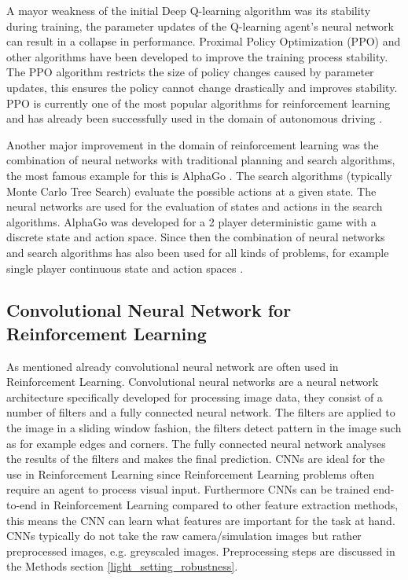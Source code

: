 A mayor weakness of the initial Deep Q-learning algorithm was its stability during training, the parameter updates of the Q-learning agent's neural network can result in a collapse in performance. Proximal Policy Optimization (PPO) and other algorithms have been developed to improve the training process stability. The PPO \autocite{ppo} algorithm restricts the size of policy changes caused by parameter updates, this ensures the policy cannot change drastically and improves stability. PPO is currently one of the most popular algorithms for reinforcement learning and has already been successfully used in the domain of autonomous driving \autocite{maximilian}.


Another major improvement in the domain of reinforcement learning was the combination of neural networks with traditional planning and search algorithms, the most famous example for this is AlphaGo \autocite{alphago}. The search algorithms (typically Monte Carlo Tree Search) evaluate the possible actions at a given state. The neural networks are used for the evaluation of states and actions in the search algorithms. AlphaGo was developed for a 2 player deterministic game with a discrete state and action space. Since then the combination of neural networks and search algorithms has also been used for all kinds of problems, for example single player continuous state and action spaces \autocite{alphagoimprovementmuzero}.


\subsection*{Convolutional Neural Network for Reinforcement Learning}

As mentioned already convolutional neural network are often used in Reinforcement Learning. Convolutional neural networks are a neural network architecture specifically developed for processing image data, they consist of a number of filters and a fully connected neural network. The filters are applied to the image in a sliding window fashion, the filters detect pattern in the image such as for example edges and corners. The fully connected neural network analyses the results of the filters and makes the final prediction.
CNNs are ideal for the use in Reinforcement Learning since Reinforcement Learning problems often require an agent to process visual input. Furthermore CNNs can be trained end-to-end in Reinforcement Learning compared to other feature extraction methods, this means the CNN can learn what features are important for the task at hand.
CNNs typically do not take the raw camera/simulation images but rather preprocessed images, e.g. greyscaled images. Preprocessing steps are discussed in the Methods section \ref*{light_setting_robustness}.



